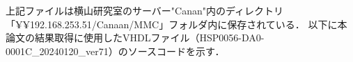 上記ファイルは横山研究室のサーバー"Canan"内のディレクトリ\\
「¥¥192.168.253.51/Canaan/MMC」フォルダ内に保存されている．
以下に本論文の結果取得に使用したVHDLファイル（HSP0056-DA0-0001C\_20240120\_ver71）のソースコードを示す．


%
\newpage

%
\newpage

%
%
%


